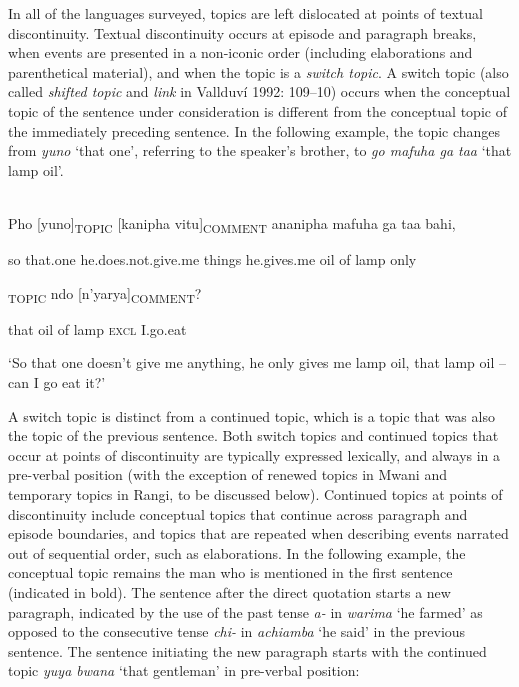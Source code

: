 \documentclass[output=paper]{langsci/langscibook}
\begin{document}
In all of the languages surveyed, topics are left dislocated at points of textual discontinuity. Textual discontinuity occurs at episode and paragraph breaks, when events are presented in a non-iconic order (including elaborations and parenthetical material), and when the topic is a \textit{switch topic}. A switch topic (also called \textit{shifted topic} and \textit{link} in Vallduví 1992: 109–10) occurs when the conceptual topic of the sentence under consideration is different from the conceptual topic of the immediately preceding sentence. In the following example, the topic changes from \textit{yuno} ‘that one’, referring to the speaker’s brother, to \textit{go mafuha ga taa} ‘that lamp oil’.

\ea\label{ex:}
\\
\gll Pho [yuno]\textsubscript{TOPIC} [kanipha vitu]\textsubscript{COMMENT}\textsubscript{ }ananipha mafuha ga taa bahi,\\
\begin{styleUntitledi}
so that.one he.does.not.give.me things he.gives.me oil of lamp only
\end{styleUntitledi}

\textsubscript{TOPIC} ndo [n’yarya]\textsubscript{COMMENT}?\\
\begin{styleUntitledi}
that oil of lamp \textsc{excl} I.go.eat
\end{styleUntitledi}

\glt \textup{‘So t}\textup{hat one doesn’t give me anything, he only gives me lamp oil, that lamp oil – can I g}\textup{o eat it?’}
\z

A switch topic is distinct from a continued topic, which is a topic that was also the topic of the previous sentence. Both switch topics and continued topics that occur at points of discontinuity are typically expressed lexically, and always in a pre-verbal position (with the exception of renewed topics in Mwani and temporary topics in Rangi, to be discussed below). Continued topics at points of discontinuity include conceptual topics that continue across paragraph and episode boundaries, and topics that are repeated when describing events narrated out of sequential order, such as elaborations. In the following example, the conceptual topic remains the man who is mentioned in the first sentence (indicated in bold). The sentence after the direct quotation starts a new paragraph, indicated by the use of the past tense \textit{a}\textit{\nobreakdash-} in \textit{w}\textit{a}\textit{rima} ‘he farmed’ as opposed to the consecutive tense \textit{chi}\textit{\nobreakdash-} in \textit{a}\textit{chi}\textit{amba} ‘he said’ in the previous sentence. The sentence initiating the new paragraph starts with the continued topic \textit{yuya bwana} ‘that gentleman’ in pre-verbal position:
\end{document}
